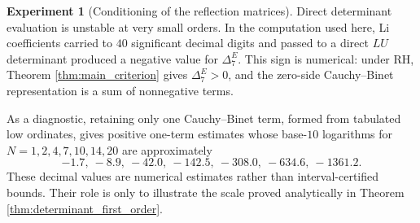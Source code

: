 \documentclass[11pt]{amsart}
\numberwithin{equation}{section}
\theoremstyle{plain}
\theoremstyle{definition}
\newtheorem{experiment}[theorem]{Experiment}
\theoremstyle{remark}
\newcommand{\RH}{\mathrm{RH}}
\begin{document}
\begin{experiment}[Conditioning of the reflection matrices]
\label{exp:conditioning}
Direct determinant evaluation is unstable at very small orders.  In the computation used here, Li coefficients carried to $40$ significant decimal digits and passed to a direct $LU$ determinant produced a negative value for $\Delta_7^E$.  This sign is numerical: under $\RH$, Theorem \ref{thm:main_criterion} gives $\Delta_7^E>0$, and the zero-side Cauchy--Binet representation is a sum of nonnegative terms.

As a diagnostic, retaining only one Cauchy--Binet term, formed from tabulated low ordinates, gives positive one-term estimates whose base-$10$ logarithms for $N=1,2,4,7,10,14,20$ are approximately
\begin{equation}
-1.7,\ -8.9,\ -42.0,\ -142.5,\ -308.0,\ -634.6,\ -1361.2.
\label{eq:experiment_determinant_lower_estimates}
\end{equation}
These decimal values are numerical estimates rather than interval-certified bounds.  Their role is only to illustrate the scale proved analytically in Theorem \ref{thm:determinant_first_order}.
\end{experiment}
\end{document}
